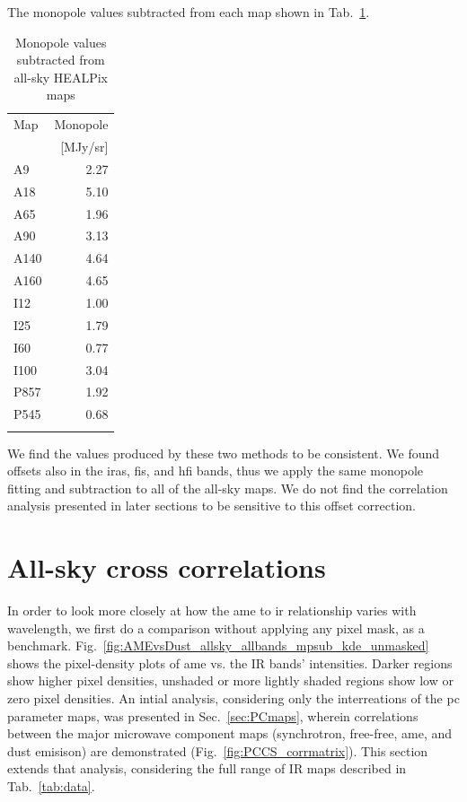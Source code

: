       The monopole values subtracted from each map shown in Tab.~\ref{tab:allsky_monopoles}.
         \begin{table}
           \caption{Monopole values subtracted from all-sky HEALPix maps}
           \centering
             \begin{tabular}{lr}
               \hline\hline
               Map & Monopole \\
                  &  [MJy/sr] \\
               \hline
               \centering
               A9  & 2.27 \\
               A18 & 5.10 \\
               A65 & 1.96 \\
               A90 & 3.13 \\
               A140 & 4.64 \\
               A160 & 4.65 \\
               I12 & 1.00 \\
               I25 & 1.79 \\
               I60 & 0.77 \\
               I100 & 3.04 \\
               P857 & 1.92 \\
               P545 & 0.68 \\
               \hline
               \label{tab:allsky_monopoles}
            \end{tabular}
         \end{table}

      We find the values produced by these two methods to be consistent. We found offsets also in the \gls{iras}, \gls{fis}, and \gls{hfi} bands, thus we apply the same monopole fitting and subtraction to all of the all-sky maps. We do not find the correlation analysis presented in later sections to be sensitive to this offset correction.

  \section{All-sky cross correlations}
        In order to look more closely at how the \gls{ame} to \gls{ir} relationship varies with wavelength, we first do a comparison without applying any pixel mask, as a benchmark. Fig.~\ref{fig:AMEvsDust_allsky_allbands_mpsub_kde_unmasked} shows the pixel-density plots of \gls{ame} vs. the IR bands' intensities. Darker regions show higher pixel densities, unshaded or more lightly shaded regions show low or zero pixel densities. An intial analysis, considering only the interreations of the \gls{pc} parameter maps, was presented in Sec.~\ref{sec:PCmaps}, wherein correlations between the major microwave component maps (synchrotron, free-free, \gls{ame}, and dust emisison) are demonstrated (Fig.~\ref{fig:PCCS_corrmatrix}). This section extends that analysis, considering the full range of IR maps described in Tab.~\ref{tab:data}.

